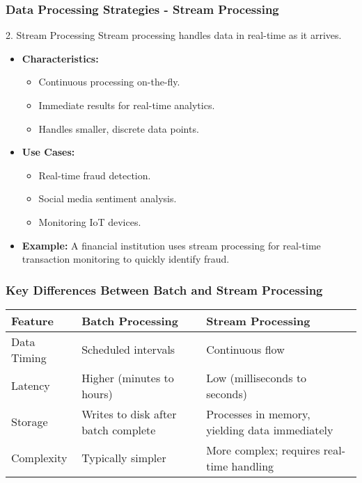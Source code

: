 \documentclass[aspectratio=169]{beamer}
\begin{document}
\begin{frame}[fragile]
  \frametitle{Data Processing Strategies - Stream Processing}
  \begin{block}{2. Stream Processing}
    Stream processing handles data in real-time as it arrives.
  \end{block}
  \begin{itemize}
    \item \textbf{Characteristics:}
    \begin{itemize}
      \item Continuous processing on-the-fly.
      \item Immediate results for real-time analytics.
      \item Handles smaller, discrete data points.
    \end{itemize}
    
    \item \textbf{Use Cases:}
    \begin{itemize}
      \item Real-time fraud detection.
      \item Social media sentiment analysis.
      \item Monitoring IoT devices.
    \end{itemize}
    
    \item \textbf{Example:} 
    A financial institution uses stream processing for real-time transaction monitoring to quickly identify fraud.
  \end{itemize}
\end{frame}

\begin{frame}[fragile]
  \frametitle{Key Differences Between Batch and Stream Processing}
  \begin{table}[ht]
    \centering
    \begin{tabular}{|l|l|l|}
      \hline
      \textbf{Feature} & \textbf{Batch Processing} & \textbf{Stream Processing} \\
      \hline
      Data Timing & Scheduled intervals & Continuous flow \\
      Latency & Higher (minutes to hours) & Low (milliseconds to seconds) \\
      Storage & Writes to disk after batch complete & Processes in memory, yielding data immediately \\
      Complexity & Typically simpler & More complex; requires real-time handling \\
      \hline
    \end{tabular}
  \end{table}
\end{frame}
\end{document}
